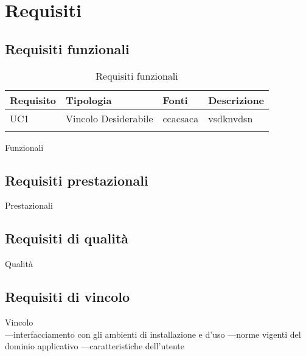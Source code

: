 \section{Requisiti}

\subsection{Requisiti funzionali}
\begin{longtable}{|l|p{2.5cm}|l|l|}
\hline
\textbf{Requisito} & \textbf{Tipologia} & \textbf{Fonti} & \textbf{Descrizione} \\
\hline
UC1 & Vincolo \linebreak Desiderabile & ccacsaca & vsdknvdsn \\
\hline
\caption{Requisiti funzionali}
\end{longtable}
Funzionali

\subsection{Requisiti prestazionali}
Prestazionali

\subsection{Requisiti di qualità}
Qualità

\subsection{Requisiti di vincolo}
Vincolo\\
---interfacciamento con gli ambienti di installazione e d'uso
---norme vigenti del dominio applicativo
---caratteristiche dell'utente